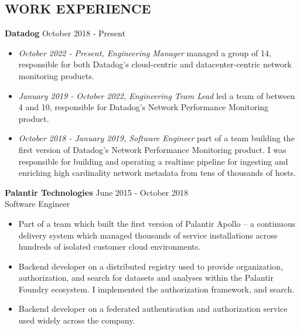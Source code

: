 \documentclass[line,margin]{res}
\begin{document}
\address{leeavital@gmail.com}

\begin{resume}

\section{WORK EXPERIENCE}

{\bf Datadog} \hfill October 2018 - Present \\
\begin{itemize}
  \item \textit{October 2022 - Present, Engineering Manager} managed a group of 14, responsible for both Datadog's cloud-centric and datacenter-centric network monitoring products.
  \item \textit{January 2019 - October 2022, Engineering Team Lead} led a team of between 4 and 10, responsible for Datadog's Network Performance Monitoring product.
  \item \textit{October 2018 - January 2019, Software Engineer} part of a team building the first version of Datadog's Network Performance Monitoring product. I was responsible for building and operating a realtime pipeline for ingesting and enriching high cardinality network metadata from tens of thousands of hosts.
\end{itemize}

{\bf Palantir Technologies} \hfill June 2015 - October 2018 \\
Software Engineer
\begin{itemize}
\item Part of a team which built the first version of Palantir Apollo -- a continuous delivery system which managed thousands of service installations across hundreds of isolated customer cloud environments.
\item Backend developer on a distributed registry used to provide organization, authorization, and search for datasets and analyses within the Palantir Foundry ecosystem. I implemented the authorization framework, and search.
\item Backend developer on a federated authentication and authorization service used widely across the company.
\end{itemize}



\end{resume}
\end{document}
